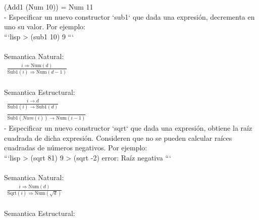 \documentclass[14pt]{article}
\begin{document}
\begin{enumerate}
      (Add1 (Num 10)) = Num 11\\

      
   - Especificar un nuevo constructor `sub1` que dada una expresión, decrementa en uno su valor. Por ejemplo: \\
     
      ```lisp
      > (sub1 10)
      9
      ```\\\\
      
      Semantica Natural:\\
      
      $\begin{gathered} \frac{i \Rightarrow \text{Num}(d)}{\text{Sub1}(i) \Rightarrow \text{Num}(d-1)} \end{gathered}$\\\\

      Semantica Estructural:\\
   
   $\begin{gathered} \frac{i \longrightarrow d}{\text{Sub1}(i) \longrightarrow \text{Sub1}(d)} \end{gathered}$\\

   $\begin{gathered} \frac{}{\text{Sub1}(Num(i)) \longrightarrow \text{Num}(i-1)} \end{gathered}$\\
      
   - Especificar un nuevo constructor `sqrt` que dada una expresión, obtiene la raíz cuadrada de dicha expresión. Consideren que no se pueden calcular raíces cuadradas de números negativos. Por ejemplo: \\
     
      ```lisp
      > (sqrt 81)
      9
      > (sqrt -2)
      error: Raíz negativa
      ```
      \\\\
   Semantica Natural:\\
   
   $\begin{gathered} \frac{i \Rightarrow \text{Num}(d)}{\text{Sqrt}(i) \Rightarrow \text{Num}(\sqrt{d})} \end{gathered}$\\\\

    Semantica Estructural:\\
   

\end{enumerate}
\end{document}
